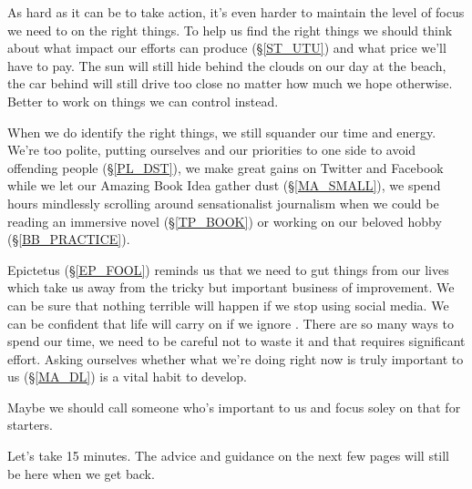 \cleardoublepage
{\small

As hard as it can be to take action, it's even harder to maintain the level of focus we need to on the right things. To help us find the right things we should think about what impact our efforts can produce (\S \ref{ST_UTU}) and what price we'll have to pay. The sun will still hide behind the clouds on our day at the beach, the car behind will still drive too close no matter how much we hope otherwise. Better to work on things we can control instead.  %

When we do identify the right things, we still squander our time and energy. We're too polite, putting ourselves and our priorities to one side to avoid offending people (\S \ref{PL_DST}), we make great gains on Twitter and Facebook while we let our Amazing Book Idea gather dust (\S \ref{MA_SMALL}), we spend hours mindlessly scrolling around sensationalist journalism when we could be reading an immersive novel (\S \ref{TP_BOOK}) or working on our beloved hobby (\S \ref{BB_PRACTICE}). 

Epictetus (\S \ref{EP_FOOL}) reminds us that we need to gut things from our lives which take us away from the tricky but important business of improvement. We can be sure that nothing terrible will happen if we stop using social media. We can be confident that life will carry on if we ignore . There are so many ways to spend our time, we need to be careful not to waste it and that requires significant effort. Asking ourselves whether what we're doing right now is truly important to us (\S \ref{MA_DL}) is a vital habit to develop.

Maybe we should call someone who's important to us and focus soley on that for starters. 

Let's take 15 minutes. The advice and guidance on the next few pages will still be here when we get back. 

}
